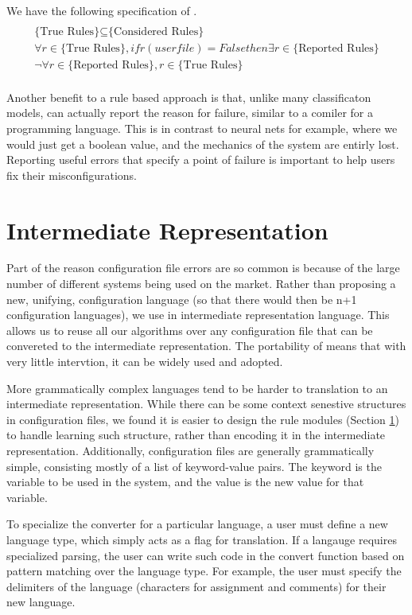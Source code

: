 We have the following specification of \app.
\begin{multline*}\\
\text{\{True Rules\}} \subseteq \text{\{Considered Rules\}} \\
\forall r \in \text{\{True Rules\}}, if r(userfile)=False then \exists r \in \text{\{Reported Rules\}} \\
\neg \forall r \in \text{\{Reported Rules\}}, r \in \text{\{True Rules\}} \\
\end{multline*}

Another benefit to a rule based approach is that, unlike many classificaton models, \app can actually report the reason for failure, similar to a comiler for a programming language.
This is in contrast to neural nets for example, where we would just get a boolean value, and the mechanics of the system are entirly lost.
Reporting useful errors that specify a point of failure is important to help users fix their misconfigurations.

\section{Intermediate Representation}

Part of the reason configuration file errors are so common is because of the large number of different systems being used on the market.
Rather than proposing a new, unifying, configuration language (so that there would then be n+1 configuration languages), we use in intermediate representation language.
This allows us to reuse all our algorithms over any configuration file that can be convereted to the intermediate representation.
The portability of \app means that with very little intervtion, it can be widely used and adopted.

More grammatically complex languages tend to be harder to translation to an intermediate representation.
While there can be some context senestive structures in configuration files, we found it is easier to design the rule modules (Section \ref{}) to handle learning such structure, rather than encoding it in the intermediate representation.
Additionally, configuration files are generally grammatically simple, consisting mostly of a list of keyword-value pairs.
The keyword is the variable to be used in the system, and the value is the new value for that variable.

To specialize the converter for a particular language, a user must define a new language type, which simply acts as a flag for translation.
If a langauge requires specialized parsing, the user can write such code in the convert function based on pattern matching over the language type.
For example, the user must specify the delimiters of the language (characters for assignment and comments) for their new language. 

